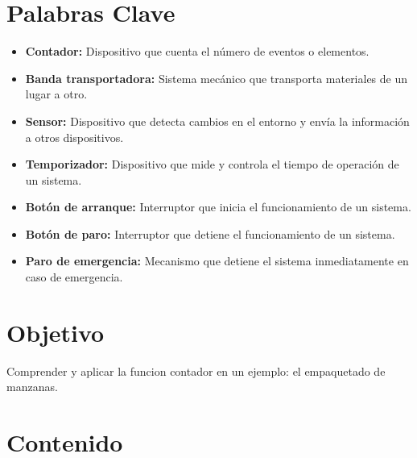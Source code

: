 \documentclass[12pt]{report}
\begin{document}
\tableofcontents
\newpage

\chapter*{Palabras Clave}
\begin{itemize}
  \item \textbf{Contador:} Dispositivo que cuenta el número de eventos o elementos.
  \item \textbf{Banda transportadora:} Sistema mecánico que transporta materiales de un lugar a otro.
  \item \textbf{Sensor:} Dispositivo que detecta cambios en el entorno y envía la información a otros dispositivos.
  \item \textbf{Temporizador:} Dispositivo que mide y controla el tiempo de operación de un sistema.
  \item \textbf{Botón de arranque:} Interruptor que inicia el funcionamiento de un sistema.
  \item \textbf{Botón de paro:} Interruptor que detiene el funcionamiento de un sistema.
  \item \textbf{Paro de emergencia:} Mecanismo que detiene el sistema inmediatamente en caso de emergencia.
\end{itemize}



\newpage

\chapter*{Objetivo}
  Comprender y aplicar la funcion contador en un ejemplo: el empaquetado de manzanas.
\newpage

\chapter{Contenido}
\end{document}
